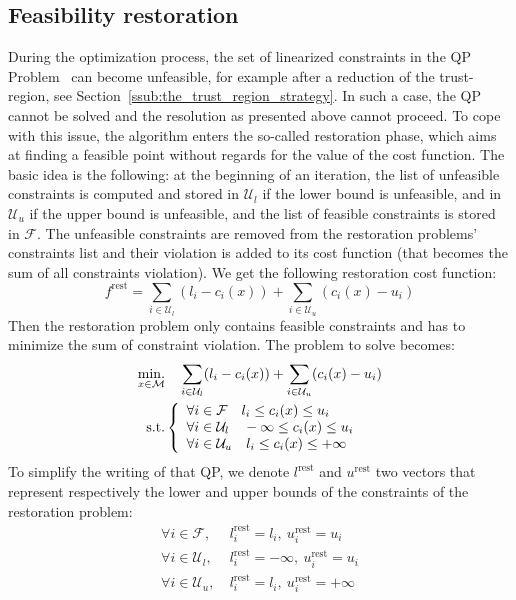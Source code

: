 \subsection{Feasibility restoration}
\label{sub:feasibility_restoration}

During the optimization process, the set of linearized constraints in the QP Problem~ can become unfeasible, for example after a reduction of the trust-region, see Section~\ref{ssub:the_trust_region_strategy}.
In such a case, the QP~ cannot be solved and the resolution as presented above cannot proceed.
To cope with this issue, the algorithm enters the so-called restoration phase, which aims at finding a feasible point without regards for the value of the cost function.
The basic idea is the following: at the beginning of an iteration, the list of unfeasible constraints is computed and stored in $\mathcal{U}_l$ if the lower bound is unfeasible, and in $\mathcal{U}_u$ if the upper bound is unfeasible, and the list of feasible constraints is stored in $\mathcal{F}$.
The unfeasible constraints are removed from the restoration problems' constraints list and their violation is added to its cost function (that becomes the sum of all constraints violation).
We get the following restoration cost function:
\begin{equation}
  f^\text{rest} = \sum_{i\in\mathcal{U}_l} (l_i - c_i(x)) +\sum_{i\in\mathcal{U}_u} (c_i(x) - u_i)
\end{equation}
Then the restoration problem only contains feasible constraints and has to minimize the sum of constraint violation.
The problem to solve becomes:
\begin{align}
\label{eq:restoration_problem}
  \operatorname*{min.}_{x \in \mathcal{M}} & \quad \sum_{i\in\mathcal{U}_l} (l_i - c_i(x)) +\sum_{i\in\mathcal{U}_u} (c_i(x) - u_i)\\ \nonumber
  \text{s.t.}&\left\{
  \begin{array}{lr}
    \forall i \in \mathcal{F}   \quad l_i \leq c_i(x) \leq u_i \\
    \forall i \in \mathcal{U}_l \quad -\infty \leq c_i(x) \leq u_i \\
    \forall i \in \mathcal{U}_u \quad l_i \leq c_i(x) \leq +\infty \\
  \end{array}\right.
\end{align}
To simplify the writing of that QP, we denote $l^\text{rest}$ and $u^\text{rest}$ two vectors that represent respectively the lower and upper bounds of the constraints of the restoration problem:
\begin{align}
  \forall i \in \mathcal{F}   ,\ & l^\text{rest}_i = l_i    ,\ u^\text{rest}_i = u_i \\
  \forall i \in \mathcal{U}_l ,\ & l^\text{rest}_i = -\infty,\ u^\text{rest}_i = u_i \\
  \forall i \in \mathcal{U}_u ,\ & l^\text{rest}_i = l_i    ,\ u^\text{rest}_i = +\infty \\
\end{align}

